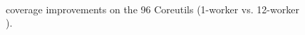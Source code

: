 \begin{figure}
  \centering
  \label{fig:coreutils-final-cov} \\
  \label{fig:coreutils-delta-cov}
  \caption{\cnine coverage improvements on the 96 Coreutils (1-worker \cnine vs. 12-worker \cnine).}
  \label{fig:coreutils-cov}
\end{figure}
\fi


